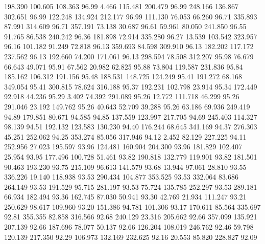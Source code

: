  198.390  100.605  108.363        96.99
   4.466  115.481  200.479        96.99
 248.166  136.867  302.651        96.99
 122.248  134.924  212.177        96.99
 111.130   76.053   66.260        96.71
 335.893   87.991  314.609        96.71
 357.191   73.138   30.687        96.61
  59.961   80.050  241.850        96.55
  91.765   86.538  240.242        96.36
 181.898   72.914  335.280        96.27
  13.539  103.542  323.957        96.16
 101.182   91.249   72.818        96.13
 359.693   84.598  309.910        96.13
 182.202  117.172  237.562        96.13
 192.660   74.200  171.061        96.13
 298.594   78.508  312.207        95.98
  76.679   66.643   49.071        95.91
  67.562   20.982   62.825        95.88
  73.804  119.587  231.836        95.84
 185.162  106.312  191.156        95.48
 188.531  148.725  124.249        95.41
 191.272   68.168  349.054        95.41
 300.815   78.624  316.188        95.37
 192.231  102.798   23.914        95.34
 172.449   92.918   44.236        95.29
   3.402   74.392  291.089        95.26
  12.772  111.718   46.299        95.26
 291.046   23.192  149.762        95.26
  40.643   52.709   39.288        95.26
  63.186   69.936  249.419        94.89
 179.851   80.671   94.585        94.85
 137.559  123.997  217.705        94.69
 245.403  114.327   98.139        94.51
 192.132  123.583  130.230        94.40
 176.244   68.645  341.169        94.37
 276.303   45.251  252.062        94.25
 353.274   85.056  317.946        94.12
   2.452   82.129  227.225        94.11
 252.956   27.023  195.597        93.96
 124.481  160.904  204.300        93.96
 181.829  102.407   25.954        93.95
 177.496  100.728   51.461        93.82
 190.818  132.779  119.901        93.82
 181.501   90.463  193.230        93.75
 215.109   96.613  141.579        93.68
  13.944   97.061   28.810        93.55
 336.226   19.140  118.938        93.53
 290.434  104.877  353.525        93.53
 332.064   83.686  264.149        93.53
 191.529   95.715  281.197        93.53
  75.724  135.785  252.297        93.53
 289.181   66.934  182.494        93.36
 162.745   87.030   50.941        93.30
  42.769   21.934  111.247        93.21
 250.629   98.617  109.960        93.20
 151.386   94.781  101.306        93.17
 170.611   85.564  335.697        92.81
 355.355   82.858  316.566        92.68
 240.129   23.316  205.662        92.66
 357.099  135.921  207.139        92.66
 187.696   78.077   50.137        92.66
 126.204  108.019  246.762        92.46
  59.798  120.139  217.350        92.29
 106.973  132.169  232.625        92.16
  20.553   85.820  228.827        92.09
